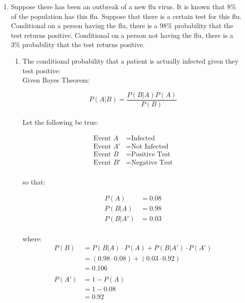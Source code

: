 \documentclass{article}
\begin{document}
\begin{enumerate}
\newpage
    \item Suppose there has been an outbreak of a new flu virus. It is known that 8\% of the population has this flu. Suppose that there is a certain test for this flu. Conditional on a person having the flu, there is a 98\% probability that the test returns positive. Conditional on a person not having the flu, there is a 3\% probability that the test returns positive.

    \begin{enumerate}
        \item The conditional probability that a patient is actually infected given they test positive:\\

        Given Bayes Theorem:

        \begin{equation}
            P(A|B) = \frac{P(B|A) P(A)}{P(B)}
        \end{equation}\\

        Let the following be true:

        \begin{equation}
        \begin{split}
            \text{Event } A &= \text{Infected}\\
            \text{Event } A' &= \text{Not Infected}\\
            \text{Event } B &= \text{Positive Test}\\
            \text{Event } B' &= \text{Negative Test}\\
        \end{split}
        \end{equation}

        so that:

        \begin{equation}
        \begin{split}
            P(A) &= 0.08\\
            P(B|A) &= 0.98\\
            P(B|A') &= 0.03\\
        \end{split}
        \end{equation}

        where:
        \begin{equation}
        \begin{split}
            P(B) &= P(B|A) \cdot P(A) + P(B|A') \cdot P(A')\\
            &= (0.98 \cdot 0.08) + (0.03 \cdot 0.92)\\
            &= 0.106\\~\\
            P(A') &= 1 - P(A)\\
            &= 1 - 0.08\\
            &= 0.92
        \end{split}
        \end{equation}


\end{enumerate}
\end{enumerate}
\end{document}
